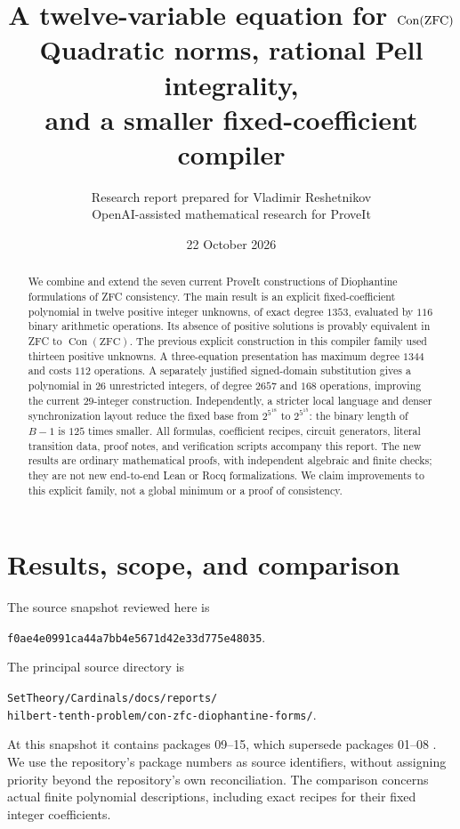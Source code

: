 \documentclass[11pt]{article}
\title{\textbf{A twelve-variable equation for \(\Con(\mathrm{ZFC})\)}\\[5pt]
\large Quadratic norms, rational Pell integrality,\\
and a smaller fixed-coefficient compiler}
\author{Research report prepared for Vladimir Reshetnikov\\
\small OpenAI-assisted mathematical research for ProveIt}
\date{22 October 2026}
\theoremstyle{remark}\newtheorem{remark}[theorem]{Remark}
\newcommand{\Con}{\operatorname{Con}}
\newcommand{\pin}{\texttt{f0ae4e0991ca44a7bb4e5671d42e33d775e48035}}
\begin{document}
\maketitle
\begin{abstract}
We combine and extend the seven current ProveIt constructions of
Diophantine formulations of ZFC consistency. The main result is an
explicit fixed-coefficient polynomial in twelve positive integer
unknowns, of exact degree \(1353\), evaluated by \(116\) binary arithmetic
operations. Its absence of positive solutions is provably equivalent
in ZFC to \(\Con(\mathrm{ZFC})\). The previous explicit construction
in this compiler family used thirteen positive unknowns.
A three-equation presentation has maximum degree \(1344\) and costs
\(112\) operations. A separately justified signed-domain substitution
gives a polynomial in \(26\) unrestricted integers, of degree \(2657\)
and \(168\) operations, improving the current \(29\)-integer construction.
Independently, a stricter local language and denser synchronization
layout reduce the fixed base from \(2^{5^{18}}\) to \(2^{5^{15}}\):
the binary length of \(B-1\) is \(125\) times smaller.
All formulas, coefficient recipes, circuit generators, literal
transition data, proof notes, and verification scripts accompany this
report. The new results are ordinary mathematical proofs, with
independent algebraic and finite checks; they are not new end-to-end
Lean or Rocq formalizations. We claim improvements to this explicit
family, not a global minimum or a proof of consistency.
\end{abstract}
\tableofcontents
\newpage

\section{Results, scope, and comparison}

The source snapshot reviewed here is
\begin{center}\small\pin.\end{center}
The principal source directory is
\begin{center}\small
\texttt{SetTheory/Cardinals/docs/reports/}\\
\texttt{hilbert-tenth-problem/con-zfc-diophantine-forms/}.
\end{center}
At this snapshot it contains packages 09--15, which supersede packages
01--08 \cite{repo}. We use the repository's package numbers as source identifiers,
without assigning priority beyond the repository's own reconciliation.
The comparison concerns actual finite polynomial descriptions, including
exact recipes for their fixed integer coefficients.
\end{document}
